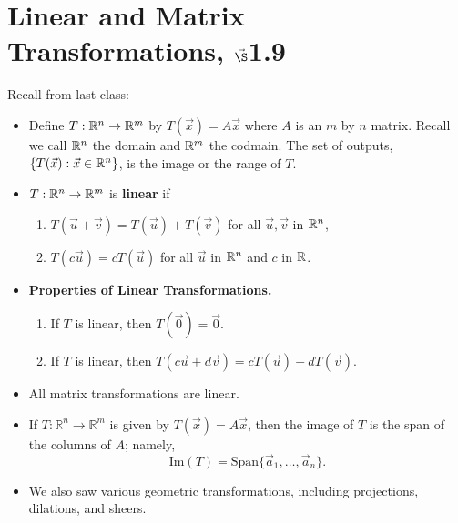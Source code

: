 


%


\section{{Linear and Matrix Transformations, $\vec\S$1.9}}%
% 

%
\thispagestyle{fancy}

Recall from last class:

\begin{itemize}

\item Define $T : \mathbb{R}^n \to \mathbb{R}^m$ by $T(\vec{x})=A\vec{x}$ where $A$ is an $m$ by $n$ matrix. Recall we call $\mathbb{R}^n$ the domain and $\mathbb{R}^m$ the codmain. The set of outputs, $\{T(\vec{x}):\vec{x}\in \mathbb{R}^n\}$, is the image or the range of $T$.
\item $T : \mathbb{R}^n \to \mathbb{R}^m$ is {\bf linear} if 
\begin{enumerate}
	\item $T(\vec{u}+\vec{v})=T(\vec{u})+T(\vec{v})$ for all $\vec{u},\vec{v}$ in $\mathbb{R}^n$,
	\item $T(c\vec{u})=cT(\vec{u})$ for all $\vec{u}$ in $\mathbb{R}^n$ and $c$ in $\mathbb{R}$.
\end{enumerate}
\item {\bf Properties of Linear Transformations.}
\begin{enumerate}
\item If $T$ is linear, then $T(\vec{0})=\vec{0}$.
\item If $T$ is linear, then $T(c\vec{u}+d\vec{v})=cT(\vec{u})+dT(\vec{v})$.
\end{enumerate} 
\item All matrix transformations are linear.
\item If $T:\mathbb{R}^n \to \mathbb{R}^m$ is given by $T(\vec{x})=A\vec{x}$, then the image of $T$ is the span of the columns of $A$; namely, $$\text{Im}(T)= \text{Span}\{ \vec{a}_1, \dots, \vec{a}_n\}.$$
\item We also saw various geometric transformations, including projections, dilations, and sheers.
\end{itemize}

\newpage

